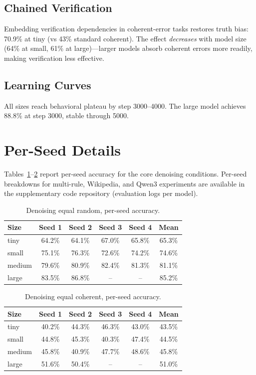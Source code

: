 \documentclass{article}
\begin{document}
\subsection{Chained Verification}

Embedding verification dependencies in coherent-error tasks restores truth bias: 70.9\% at tiny (vs 43\% standard coherent). The effect \emph{decreases} with model size (64\% at small, 61\% at large)---larger models absorb coherent errors more readily, making verification less effective.

\subsection{Learning Curves}

All sizes reach behavioral plateau by step 3000--4000. The large model achieves 88.8\% at step 3000, stable through 5000.

\section{Per-Seed Details}
\label{app:seeds}

Tables~\ref{tab:seeds_random}--\ref{tab:seeds_coherent} report per-seed accuracy for the core denoising conditions. Per-seed breakdowns for multi-rule, Wikipedia, and Qwen3 experiments are available in the supplementary code repository (evaluation logs per model).

\begin{table}[h]
\centering
\small
\begin{tabular}{lccccc}
\toprule
Size & Seed 1 & Seed 2 & Seed 3 & Seed 4 & Mean \\
\midrule
tiny   & 64.2\% & 64.1\% & 67.0\% & 65.8\% & 65.3\% \\
small  & 75.1\% & 76.3\% & 72.6\% & 74.2\% & 74.6\% \\
medium & 79.6\% & 80.9\% & 82.4\% & 81.3\% & 81.1\% \\
large  & 83.5\% & 86.8\% & --     & --     & 85.2\% \\
\bottomrule
\end{tabular}
\caption{Denoising equal random, per-seed accuracy.}
\label{tab:seeds_random}
\end{table}

\begin{table}[h]
\centering
\small
\begin{tabular}{lccccc}
\toprule
Size & Seed 1 & Seed 2 & Seed 3 & Seed 4 & Mean \\
\midrule
tiny   & 40.2\% & 44.3\% & 46.3\% & 43.0\% & 43.5\% \\
small  & 44.8\% & 45.3\% & 40.3\% & 47.4\% & 44.5\% \\
medium & 45.8\% & 40.9\% & 47.7\% & 48.6\% & 45.8\% \\
large  & 51.6\% & 50.4\% & --     & --     & 51.0\% \\
\bottomrule
\end{tabular}
\caption{Denoising equal coherent, per-seed accuracy.}
\label{tab:seeds_coherent}
\end{table}
\end{document}
